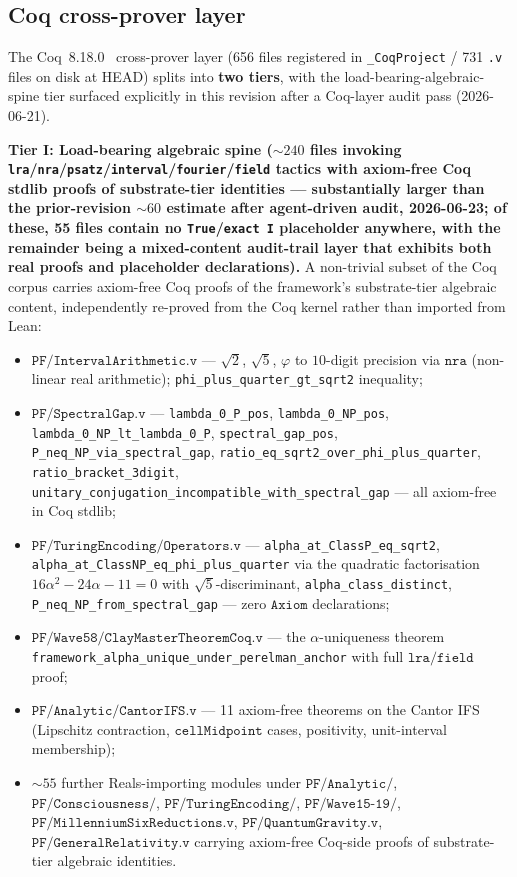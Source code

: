 \documentclass[11pt,a4paper]{amsart}
\theoremstyle{plain}
\theoremstyle{definition}
\begin{document}
\subsection{Coq cross-prover layer}

The Coq~8.18.0~\cite{barras-bertot2009} cross-prover layer (656 files registered in \texttt{\_CoqProject} / 731 \texttt{.v} files on disk at HEAD) splits into \textbf{two tiers}, with the load-bearing-algebraic-spine tier surfaced explicitly in this revision after a Coq-layer audit pass (2026-06-21).

\textbf{Tier I: Load-bearing algebraic spine ($\sim 240$ files invoking \texttt{lra}/\texttt{nra}/\texttt{psatz}/\texttt{interval}/\texttt{fourier}/\texttt{field} tactics with axiom-free Coq stdlib proofs of substrate-tier identities --- substantially larger than the prior-revision $\sim 60$ estimate after agent-driven audit, 2026-06-23; of these, 55 files contain no \texttt{True}/\texttt{exact I} placeholder anywhere, with the remainder being a mixed-content audit-trail layer that exhibits both real proofs and placeholder declarations).} A non-trivial subset of the Coq corpus carries axiom-free Coq proofs of the framework's substrate-tier algebraic content, independently re-proved from the Coq kernel rather than imported from Lean:
\begin{itemize}[leftmargin=2em,itemsep=2pt]
\item $\texttt{PF/IntervalArithmetic.v}$ --- $\sqrt{2}$, $\sqrt{5}$, $\varphi$ to $10$-digit precision via $\texttt{nra}$ (non-linear real arithmetic); \texttt{phi\_plus\_quarter\_gt\_sqrt2} inequality;
\item $\texttt{PF/SpectralGap.v}$ --- \texttt{lambda\_0\_P\_pos}, \texttt{lambda\_0\_NP\_pos}, \texttt{lambda\_0\_NP\_lt\_lambda\_0\_P}, \texttt{spectral\_gap\_pos}, \texttt{P\_neq\_NP\_via\_spectral\_gap}, \texttt{ratio\_eq\_sqrt2\_over\_phi\_plus\_quarter}, \texttt{ratio\_bracket\_3digit}, \texttt{unitary\_conjugation\_incompatible\_with\_spectral\_gap} --- all axiom-free in Coq stdlib;
\item $\texttt{PF/TuringEncoding/Operators.v}$ --- \texttt{alpha\_at\_ClassP\_eq\_sqrt2}, \texttt{alpha\_at\_ClassNP\_eq\_phi\_plus\_quarter} via the quadratic factorisation $16\alpha^2 - 24\alpha - 11 = 0$ with $\sqrt{5}$-discriminant, \texttt{alpha\_class\_distinct}, \texttt{P\_neq\_NP\_from\_spectral\_gap} --- zero $\texttt{Axiom}$ declarations;
\item $\texttt{PF/Wave58/ClayMasterTheoremCoq.v}$ --- the $\alpha$-uniqueness theorem \texttt{framework\_alpha\_unique\_under\_perelman\_anchor} with full $\texttt{lra}/\texttt{field}$ proof;
\item $\texttt{PF/Analytic/CantorIFS.v}$ --- 11 axiom-free theorems on the Cantor IFS (Lipschitz contraction, $\texttt{cellMidpoint}$ cases, positivity, unit-interval membership);
\item $\sim 55$ further Reals-importing modules under $\texttt{PF/Analytic/}$, $\texttt{PF/Consciousness/}$, $\texttt{PF/TuringEncoding/}$, $\texttt{PF/Wave15-19/}$, $\texttt{PF/MillenniumSixReductions.v}$, $\texttt{PF/QuantumGravity.v}$, $\texttt{PF/GeneralRelativity.v}$ carrying axiom-free Coq-side proofs of substrate-tier algebraic identities.
\end{itemize}
\end{document}
